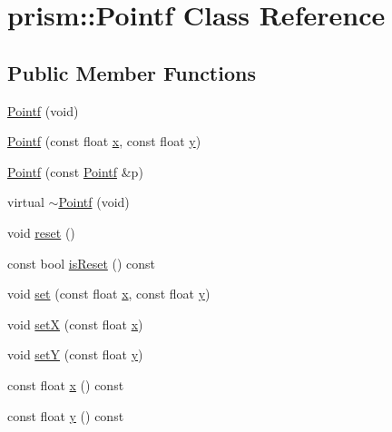 \hypertarget{classprism_1_1_pointf}{}\section{prism\+:\+:Pointf Class Reference}
\label{classprism_1_1_pointf}
\subsection*{Public Member Functions}
\begin{DoxyCompactItemize}
\item 
\hyperlink{classprism_1_1_pointf_a214778342e0ac8ca95ebee01e196af20}{Pointf} (void)
\item 
\hyperlink{classprism_1_1_pointf_a8c069c8a342d043475661270d19e6579}{Pointf} (const float \hyperlink{classprism_1_1_pointf_af55252d2e1d5ba4d2358538aadeaf6a8}{x}, const float \hyperlink{classprism_1_1_pointf_a2fedfacbfdce3fc0a305bb0ed2529f62}{y})
\item 
\hyperlink{classprism_1_1_pointf_a8888306775c8851d1808881025d547df}{Pointf} (const \hyperlink{classprism_1_1_pointf}{Pointf} \&p)
\item 
virtual \hyperlink{classprism_1_1_pointf_a1398ea1647393b4a4c50634cd0cacf42}{$\sim$\+Pointf} (void)
\item 
void \hyperlink{classprism_1_1_pointf_a31b2e88932f79ac96b2372a8443ede29}{reset} ()
\item 
const bool \hyperlink{classprism_1_1_pointf_afb4d14c8abbe802ea4be1de549ce36fd}{is\+Reset} () const 
\item 
void \hyperlink{classprism_1_1_pointf_a2848b665d31a7ca22a268803870f4158}{set} (const float \hyperlink{classprism_1_1_pointf_af55252d2e1d5ba4d2358538aadeaf6a8}{x}, const float \hyperlink{classprism_1_1_pointf_a2fedfacbfdce3fc0a305bb0ed2529f62}{y})
\item 
void \hyperlink{classprism_1_1_pointf_ac9cff1c37b29ba26efd4a1eeea5212d6}{setX} (const float \hyperlink{classprism_1_1_pointf_af55252d2e1d5ba4d2358538aadeaf6a8}{x})
\item 
void \hyperlink{classprism_1_1_pointf_af27c766dfd1d5973e3ec1d9ce2defb80}{setY} (const float \hyperlink{classprism_1_1_pointf_a2fedfacbfdce3fc0a305bb0ed2529f62}{y})
\item 
const float \hyperlink{classprism_1_1_pointf_af55252d2e1d5ba4d2358538aadeaf6a8}{x} () const 
\item 
const float \hyperlink{classprism_1_1_pointf_a2fedfacbfdce3fc0a305bb0ed2529f62}{y} () const 
\item 

\end{DoxyCompactItemize}
